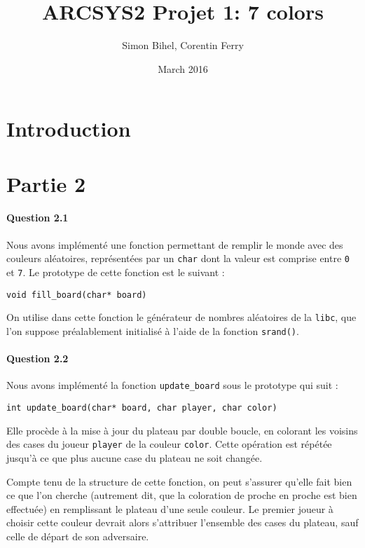 \documentclass[a4paper]{article}
\title{ARCSYS2 Projet 1: 7 colors}
\author{Simon Bihel, Corentin Ferry}
\date{March 2016}
\begin{document}
    \maketitle

    \section{Introduction}

    \section{Partie 2}
    \paragraph{Question 2.1}
    Nous avons implémenté une fonction permettant de remplir le monde avec
des couleurs aléatoires, représentées par un \texttt{char} dont la valeur est
comprise entre \texttt{0} et \texttt{7}.
Le prototype de cette fonction est le suivant :
\begin{lstlisting}
void fill_board(char* board)
\end{lstlisting}
On utilise dans cette fonction le générateur de nombres aléatoires de la
\texttt{libc}, que l'on suppose préalablement initialisé à l'aide de la
fonction \texttt{srand()}.

    \paragraph{Question 2.2}

    Nous avons implémenté la fonction \texttt{update\_board} sous le prototype 
qui suit :
\begin{lstlisting}
int update_board(char* board, char player, char color)
\end{lstlisting}
Elle procède à la mise à jour du plateau par double boucle, en colorant les 
voisins des cases du joueur \texttt{player} de la couleur \texttt{color}.
Cette opération est répétée jusqu'à ce que plus aucune case du plateau ne soit 
changée.

Compte tenu de la structure de cette fonction, on peut s'assurer qu'elle fait 
bien ce que l'on cherche (autrement dit, que la coloration de proche en proche 
est bien effectuée) en remplissant le plateau d'une seule couleur. Le premier 
joueur à choisir cette couleur devrait alors s'attribuer l'ensemble des cases 
du plateau, sauf celle de départ de son adversaire. 
\end{document}
